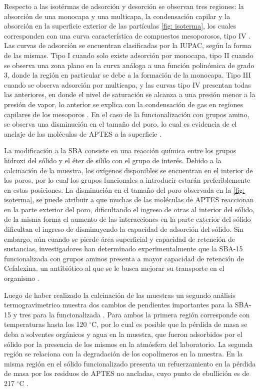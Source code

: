 \documentclass[fleqn, 12pt]{SelfArx}
\begin{document}
Respecto a las isot\'ermas de adsorci\'on y desorci\'on se observan tres regiones: la absorci\'on de una monocapa y una multicapa, la condensaci\'on capilar y la absorci\'on en la superficie exterior de las part\'iculas \autoref{fig: isoterma}, los cuales corresponden con una curva caracter\'istica de compuestos mesoporosos, tipo IV \cite{vargas_legnoverde_giraldo_basaldella_moreno-pirajan_2010}. Las curvas de adsorci\'on se encuentran clasificadas por la IUPAC, seg\'un la forma de las mismas. Tipo I cuando solo existe adsorci\'on por monocapa, tipo II cuando se observa una zona plano en la curva an\'aloga a una funci\'on polin\'omica de grado 3, donde la regi\'on en particular se debe a la formaci\'on de la monocapa. Tipo III cuando se observa adsorci\'on por multicapa, y las curvas tipo IV presentan todas las anteriores, en donde el nivel de saturaci\'on se alcanza a una presi\'on menor a la presi\'on de vapor, lo anterior se explica con la condensaci\'on de gas en  regiones capilares de los mesoporos \cite{sing_2001}. En el caso de la funcionalizaci\'on con grupos amino, se observa una disminuci\'on en el tama\~no del poro, lo cual es evidencia de el anclaje de las mol\'eculas de APTES a la superficie \cite{vargas_legnoverde_giraldo_basaldella_moreno-pirajan_2010}.

La modificaci\'on a la SBA consiste en una reacci\'on qu\'imica entre los grupos hidroxi del s\'olido y el \'eter de sililo con el grupo de inter\'es. Debido a la calcinaci\'on de la muestra, los ox\'igenos disponibles se encuentran en el interior de los poros, por lo cual los grupos funcionales a introducir estar\'an preferiblemente en estas posiciones. La disminuci\'on en el tama\~no del poro observada en la \autoref{fig: isoterma}, se puede atribuir a que muchas de las mol\'eculas de APTES reaccionan en la parte exterior del poro, dificultando el ingreso de otras al interior del s\'olido, de la misma forma el aumento de las interacciones en la parte exterior del s\'olido dificultan el ingreso de  disminuyendo la capacidad de adsorci\'on del s\'olido. Sin embargo, a\'un cuando se pierde \'area superficial y capacidad de retenci\'on de sustancias, investigadores han determinado experimentalmente que la SBA-15 funcionalizada con grupos aminos presenta a mayor capacidad de retenci\'on de Cefalexina, un antibi\'otico al que se le busca mejorar su transporte en el organismo \cite{vargas_legnoverde_giraldo_basaldella_moreno-pirajan_2010}.

Luego de haber realizado la calcinaci\'on de las muestras un segundo an\'alisis termogravimetrico muestra dos cambios de pendientes importantes para la SBA-15 y tres para la funcionalizada \cite{rodriguez}. Para ambos la primera regi\'on corresponde con temperaturas hasta los 120 $^\circ$C, por lo cual es posible que la p\'erdida de masa se deba a solventes org\'anicos y agua en la muestra, que fueron adsorbidos por el s\'olido por la presencia de los mismos en la atm\'osfera del laboratorio. La segunda regi\'on se relaciona con la degradaci\'on de los copol\'imeros en la muestra. En la misma regi\'on en el s\'olido funcionalizado presenta un refuerzamiento en la p\'erdida de masa por los residuos de APTES no ancladas, cuyo punto de ebullici\'on es de 217 $^\circ$C \cite{hawley_1981}.
\end{document}
